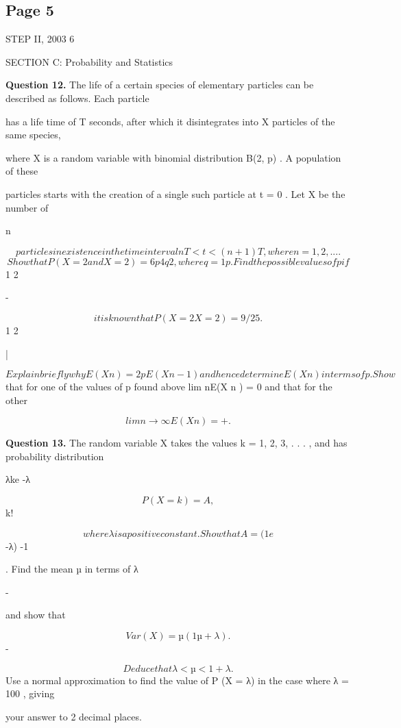 \documentclass[12pt]{article}
\begin{document}
\subsection*{Page 5}
\begin{flushleft}
STEP II, 2003 6\par
SECTION C: Probability and Statistics\par
\bigskip\textbf{Question 12.} The life of a certain species of elementary particles can be described as follows. Each particle\par
has a life time of T seconds, after which it disintegrates into X particles of the same species,\par
where X is a random variable with binomial distribution B(2, p) . A population of these\par
particles starts with the creation of a single such particle at t = 0 . Let X be the number of\par
n\par
\[particles in existence in the time interval nT < t < (n + 1)T , where n = 1 , 2 , . . ..\]
\[Show that P(X = 2 and X = 2) = 6p4q2 , where q = 1 p . Find the possible values of p if\]
1 2\par
-\par
\[it is known that P(X = 2 X = 2) = 9/25 .\]
1 2\par
|\par
\[Explain briefly why E(X n ) = 2pE(X n-1 ) and hence determine E(X n ) in terms of p. Show\]
that for one of the values of p found above lim n\to\infty E(X n ) = 0 and that for the other\par
\[lim n\to\infty E(X n ) = + .\]
\infty\par
\bigskip\textbf{Question 13.} The random variable X takes the values k = 1, 2, 3, . . . , and has probability distribution\par
λke -λ\par
\[P(X = k) = A ,\]
k!\par
\[where λ is a positive constant. Show that A = (1 e\]
-λ) -1\par
. Find the mean µ in terms of λ\par
-\par
and show that\par
\[Var (X) = µ(1 µ + λ) .\]
-\par
\[Deduce that λ < µ < 1 + λ .\]
Use a normal approximation to find the value of P (X = λ) in the case where λ = 100 , giving\par
your answer to 2 decimal places.\par

\end{flushleft}
\end{document}
